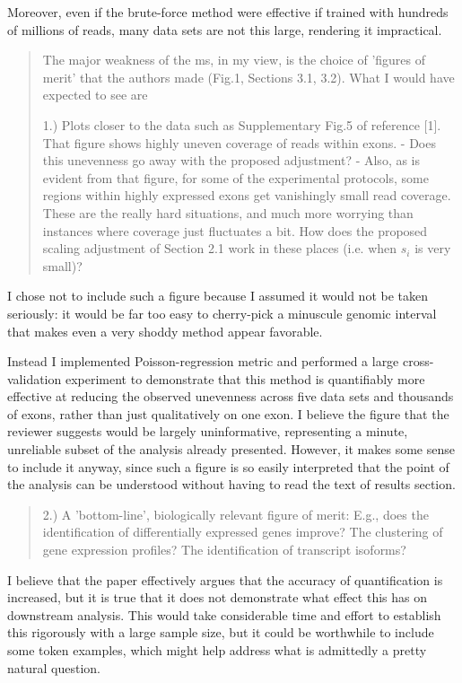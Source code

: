 \documentclass{article}
\begin{document}
Moreover, even if the brute-force method were effective if trained with hundreds
of millions of reads, many data sets are not this large, rendering
it impractical.




\begin{quote}
The major weakness of the ms, in my view, is the choice of 'figures of
merit' that the authors made (Fig.1, Sections 3.1, 3.2). What I would
have expected to see are

1.) Plots closer to the data such as Supplementary Fig.5 of
reference [1]. That figure shows highly uneven coverage of reads
within exons.
- Does this unevenness go away with the proposed adjustment?
- Also, as is evident from that figure, for some of the experimental
protocols, some regions within highly expressed exons get vanishingly
small read coverage.  These are the really hard situations, and much
more worrying than instances where coverage just fluctuates a bit.
How does the proposed scaling adjustment of Section 2.1 work in these
places (i.e. when $s_{i}$ is very small)?
\end{quote}

I chose not to include such a figure because I assumed it would not be taken
seriously: it would be far too easy to cherry-pick a minuscule genomic interval
that makes even a very shoddy method appear favorable.

Instead I implemented Poisson-regression metric and performed a large
cross-validation experiment to demonstrate that this method is quantifiably more
effective at reducing the observed unevenness across five data sets and
thousands of exons, rather than just qualitatively on one exon. I believe the
figure that the reviewer suggests would be largely uninformative, representing a
minute, unreliable subset of the analysis already presented.  However, it
makes some sense to include it anyway, since such a figure is so easily interpreted
that the point of the analysis can be understood without having to read the text
of results section.


\begin{quote}
2.) A 'bottom-line', biologically relevant figure of merit: E.g., does
the identification of differentially expressed genes improve? The
clustering of gene expression profiles? The identification of
transcript isoforms?
\end{quote}

I believe that the paper effectively argues that the accuracy of quantification
is increased, but it is true that it does not demonstrate what effect this has
on downstream analysis. This would take considerable time and effort to
establish this rigorously with a large sample size, but it could be worthwhile
to include some token examples, which might help address what is admittedly a
pretty natural question.
\end{document}
